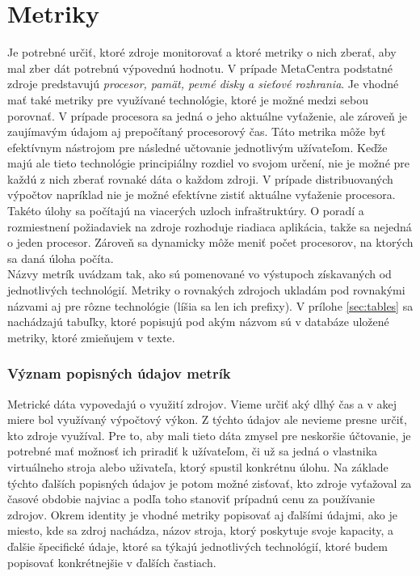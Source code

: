 \documentclass[printed,11pt,twoside,color,cover,table]{fithesis3}
\begin{document}
\chapter{Metriky}
Je potrebné určiť, ktoré zdroje monitorovať a ktoré metriky o nich zberať, aby mal zber dát potrebnú výpovednú hodnotu. V prípade MetaCentra podstatné
zdroje predstavujú \emph{procesor, pamät, pevné disky a sieťové rozhrania}. Je vhodné mať také metriky pre využívané technológie,
ktoré je možné medzi sebou porovnať. V prípade procesora sa jedná o jeho aktuálne vyťaženie, ale zároveň je zaujímavým údajom aj prepočítaný procesorový čas. Táto metrika môže byť efektívnym
nástrojom pre následné učtovanie jednotlivým užívateľom. Keďže majú ale tieto technológie principiálny rozdiel vo svojom určení, nie je možné pre každú z nich zberať rovnaké dáta o každom zdroji. 
V prípade distribuovaných výpočtov napríklad nie je možné efektívne zistiť aktuálne vyťaženie procesora. Takéto úlohy sa počítajú na viacerých uzloch infraštruktúry. O poradí a rozmiestnení požiadaviek na zdroje
rozhoduje riadiaca aplikácia, takže sa nejedná o jeden procesor. Zároveň sa dynamicky môže meniť počet procesorov, na ktorých sa daná úloha počíta.
\\Názvy metrík uvádzam tak, ako sú pomenované vo výstupoch získavaných od jednotlivých technológií. Metriky o rovnakých zdrojoch ukladám pod rovnakými názvami aj pre
rôzne technológie (líšia sa len ich prefixy). V prílohe \ref{sec:tables} sa nachádzajú tabuľky, ktoré popisujú pod akým názvom sú v databáze uložené metriky, ktoré zmieňujem v texte.

\subsection{Význam popisných údajov metrík}
Metrické dáta vypovedajú o využití zdrojov. Vieme určiť aký dlhý čas a v akej miere bol využívaný výpočtový výkon. Z týchto údajov ale nevieme presne určiť, kto zdroje využíval. Pre to, aby mali tieto dáta zmysel 
pre neskoršie účtovanie, je potrebné mať možnosť ich priradiť k užívateľom, či už sa jedná o vlastnika virtuálneho stroja alebo uživateľa, ktorý spustil konkrétnu úlohu. Na základe týchto ďalších popisných údajov je potom 
možné zisťovať, kto zdroje vyťažoval za časové obdobie najviac a podľa toho stanoviť prípadnú cenu za používanie zdrojov. Okrem identity je vhodné metriky popisovať aj ďalšími údajmi, ako je miesto, kde
sa zdroj nachádza, názov stroja, ktorý poskytuje svoje kapacity, a ďalšie špecifické údaje, ktoré sa týkajú jednotlivých technológií, ktoré budem popisovať konkrétnejšie v ďalších častiach.
\end{document}

